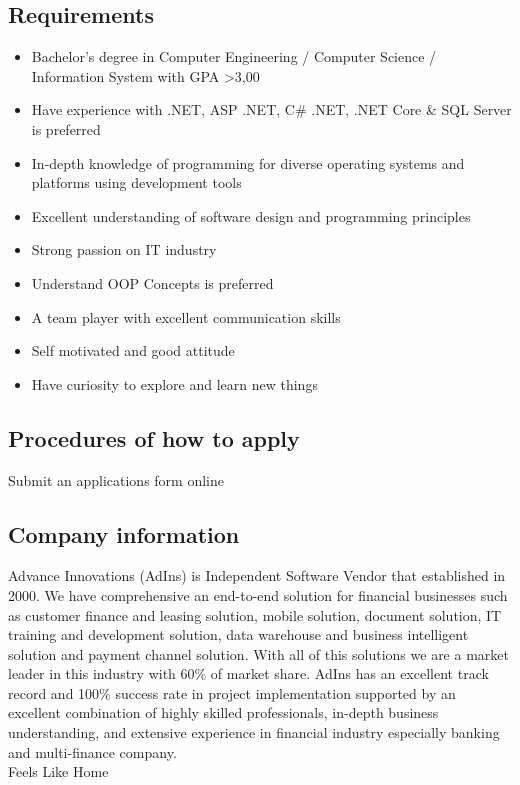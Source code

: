 \documentclass[12pt,titlepage]{article}
\begin{document}
\subsection*{Requirements}
\begin{itemize}
    \item Bachelor’s degree in Computer Engineering / Computer Science / Information System with GPA \textgreater  3,00
    \item Have experience with .NET, ASP .NET, C\# .NET, .NET Core \& SQL Server is preferred
    \item In-depth knowledge of programming for diverse operating systems and platforms using development tools
    \item Excellent understanding of software design and programming principles
    \item Strong passion on IT industry
    \item Understand OOP Concepts is preferred
    \item A team player with excellent communication skills
    \item Self motivated and good attitude
    \item Have curiosity to explore and learn new things
\end{itemize}
\subsection*{Procedures of how to apply}
Submit an applications form online
\subsection*{Company information}

Advance Innovations (AdIns) is Independent Software Vendor that established in 2000. We have comprehensive an end-to-end solution for financial businesses such as customer finance and leasing solution, mobile solution, document solution, IT training and development solution, data warehouse and business intelligent solution and payment channel solution. With all of this solutions we are a market leader in this industry with 60\% of market share. AdIns has an excellent track record and 100\% success rate in project implementation supported by an excellent combination of highly skilled professionals, in-depth business understanding, and extensive experience in financial industry especially banking and multi-finance company. \\

Feels Like Home \\
\end{document}
